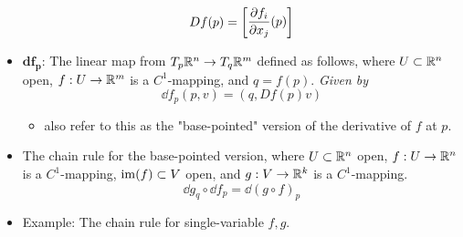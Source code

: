 \documentclass[../notes.tex]{subfiles}
\begin{document}
\begin{itemize}
    \begin{equation*}
        Df(p) =
        \begin{bmatrix}
            \displaystyle{\pdv{f_i}{x_j}}(p)
        \end{bmatrix}
    \end{equation*}
    \item $\bm{\mathbf{d}f_p}$: The linear map from $T_p\mathbb{R}^n\to T_q\mathbb{R}^m$ defined as follows, where $U\subset\mathbb{R}^n$ open, $f:U\to\mathbb{R}^m$ is a $C^1$-mapping, and $q=f(p)$. \emph{Given by}
    \begin{equation*}
        \dd f_p(p,v) = (q,Df(p)v)
    \end{equation*}
    \begin{itemize}
        \item \textcite{bib:DifferentialForms} also refer to this as the "base-pointed" version of the derivative of $f$ at $p$.
    \end{itemize}
    \item The chain rule for the base-pointed version, where $U\subset\mathbb{R}^n$ open, $f:U\to\mathbb{R}^n$ is a $C^1$-mapping, $\operatorname{im}(f)\subset V$ open, and $g:V\to\mathbb{R}^k$ is a $C^1$-mapping.
    \begin{equation*}
        \dd g_q\circ\dd f_p = \dd(g\circ f)_p
    \end{equation*}
    \item Example: The chain rule for single-variable $f,g$.
    \begin{figure}[H]
        \centering
        \def\angl{-120}
\end{figure}
\end{itemize}
\end{document}
